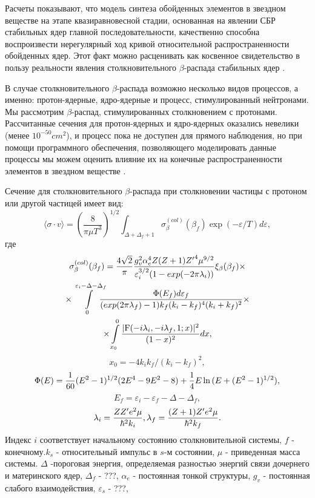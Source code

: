 \documentclass[14pt, a4paper]{article}
\begin{document}
Расчеты показывают, что модель синтеза обойденных элементов в звездном веществе на этапе квазиравновесной стадии, основанная на явлении СБР стабильных ядер главной последовательности, качественно способна воспроизвести нерегулярный ход кривой относительной распространенности обойденных ядер. Этот факт можно расценивать как косвенное свидетельство в пользу реальности явления столкновительного $\beta$-распада стабильных ядер \cite{tak}.

В случае столкновительного $\beta$-распада возможно несколько видов процессов, а именно: протон-ядерные, ядро-ядерные и процесс, стимулированный нейтронами. Мы рассмотрим $\beta$-распад, стимулированных столкновением с протонами. Рассчитанные сечения для протон-ядерных и ядро-ядерных оказались невелики (менее $10^{-50}cm^2$), и процесс пока не доступен для прямого наблюдения, но при помощи программного обеспечения, позволяющего моделировать данные процессы мы можем оценить влияние их на конечные распространенности элементов в звездном веществе \cite{tak_article}.

Сечение для столкновительного $\beta$-распада при столкновении частицы с протоном или другой частицей имеет вид:
\begin{equation} \label{sech}
\langle\sigma \cdot v\rangle = \left(\frac{8}{\pi\mu T^3}\right)^{1/2} \int_{\Delta + \Delta_f + 1} \sigma^{(col)}_\beta(\beta_f) \exp(-\varepsilon/T)d\varepsilon,
\end{equation}
где  
\begin{multline} \label{sig}
\sigma^{(col)}_\beta(\beta_f)=
{4\sqrt{2}\over \pi} {{g^2_v\alpha_e^4Z (Z+1) {Z'}^4 \mu^{9/2}}
	\over{\varepsilon_i^{3/2} (1-exp(-2\pi\lambda_i))}}
\xi_\beta(\beta_f)
\times\\
\times\int\limits_0^{\varepsilon_i{-}\Delta{-}\Delta_f}\!\!\!\!\!
{{\Phi(E_f) d\varepsilon_f}\over{(exp(2\pi\lambda_f)-1)
		k_f ( k_i- k_f)^4(k_i+k_f)^2}}\times\\
\times\int\limits_{x_0}^0 {{|{\rm F}(-i \lambda_i, -i\lambda_f,1; x)|^2}\over{(1-x)^2}} dx,
\end{multline}
$$
x_0=-4 k_i k_f/(k_i- k_f)^2,
$$
$$
\Phi (E)={1\over 60}(E^2-1)^{1/2}(2E^4-9E^2-8)+{1\over 4}E\ln{(E+(E^2-1)^{1/2})},
$$
$$
E_f=\varepsilon_i-\varepsilon_f-\Delta-\Delta_f,
$$
$$
\lambda_i = {Z Z' e^2 \mu\over {\hbar}^2 k_i},
\lambda_f = {(Z+1) Z' e^2 \mu\over \hbar^2 k_f}.
$$
Индекс $i$ соответствует начальному состоянию столкновительной системы, $f$ - конечному.$k_s$ - относительный импульс в $s$-м состоянии, $\mu$ - приведенная масса системы. $\Delta$ -пороговая энергия, определяемая разностью энергий связи дочернего и материнского ядер, $\Delta_f$ - ???, $\alpha_e$ - постоянная тонкой структуры, $g_v$ - постоянная слабого взаимодействия, $\varepsilon_s$ - ???,
\end{document}
